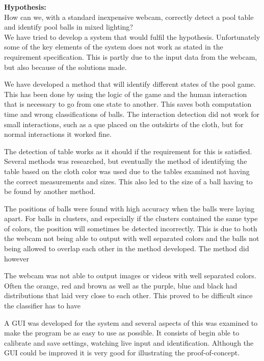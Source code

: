 \textbf{Hypothesis:}\\
How can we, with a standard inexpensive webcam, correctly detect a pool table and identify pool balls in mixed lighting?\\

We have tried to develop a system that would fulfil the hypothesis. Unfortunately some of the key elements of the system does not work as stated in the requirement specification. This is partly due to the input data from the webcam, but also because of the solutions made.

We have developed a method that will identify different states of the pool game. This has been done by using the logic of the game and the human interaction that is necessary to go from one state to another. This saves both computation time and wrong classifications of balls. The interaction detection did not work for small interactions, such as a que placed on the outskirts of the cloth, but for normal interactions it worked fine.

The detection of table works as it should if the requirement for this is satisfied. Several methods was researched, but eventually the method of identifying the table based on the cloth color was used due to the tables examined not having the correct measurements and sizes. This also led to the size of a ball having to be found by another method.

The positions of balls were found with high accuracy when the balls were laying apart. For balls in clusters, and especially if the clusters contained the same type of colors, the position will sometimes be detected incorrectly. This is due to both the webcam not being able to output with well separated colors and the balls not being allowed to overlap each other in the method developed. The method did however 



The webcam was not able to output images or videos with well separated colors. Often the orange, red and brown as well as the purple, blue and black had distributions that laid very close to each other. This proved to be difficult since the classifier has to have 

A GUI was developed for the system and several aspects of this was examined to make the program be as easy to use as possible. It consists of begin able to calibrate and save settings, watching live input and identification. Although the GUI could be improved it is very good for illustrating the proof-of-concept.

